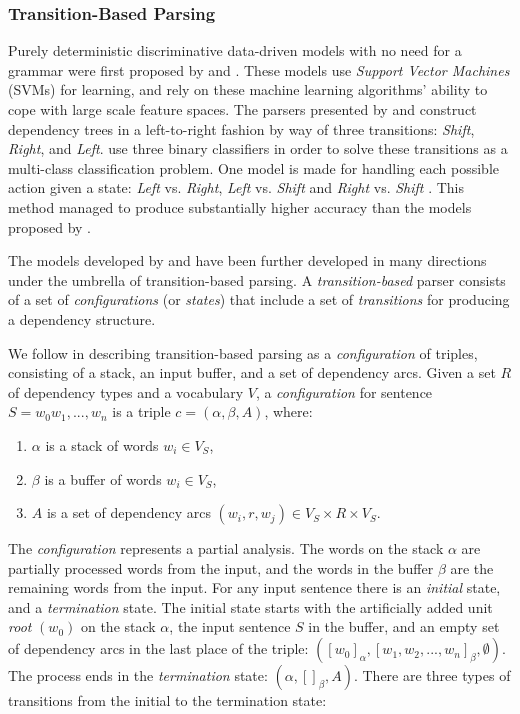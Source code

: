 \subsubsection{Transition-Based Parsing}
\label{ssc:background:transition-based}

Purely deterministic discriminative data-driven models with no need for a grammar were first proposed by  and . These models use \textit{Support Vector Machines} (SVMs) for learning, and rely on these machine learning algorithms' ability to cope with large scale feature spaces. The parsers presented by \citeauthor{Kudo:00} and \citeauthor{Yamada:03} construct dependency trees in a left-to-right fashion by way of three transitions: \textit{Shift}, \textit{Right}, and \textit{Left}. \citeauthor{Yamada:03} use three binary classifiers in order to solve these transitions as a multi-class classification problem. One model is made for handling each possible action given a state: \textit{Left} vs. \textit{Right}, \textit{Left} vs. \textit{Shift} and \textit{Right} vs. \textit{Shift} \cite{Yamada:03}. This method managed to produce substantially higher accuracy than the models proposed by .

The models developed by \citeauthor{Kudo:00} and \citeauthor{Yamada:03} have been further developed in many directions under the umbrella of transition-based parsing. A \textit{transition-based} parser consists of a set of \textit{configurations} (or \textit{states}) that include a set of \textit{transitions} for producing a dependency structure.

We follow  in describing transition-based parsing as a \textit{configuration} of triples, consisting of a stack, an input buffer, and a set of dependency arcs. Given a set $R$ of dependency types and a vocabulary $V$, a \textit{configuration} for sentence $S = w_0w_1, ..., w_n$ is a triple $c = (\alpha, \beta, A)$, where:

\begin{enumerate}
\item $\alpha$ is a stack of words $w_i \in V_S$,
\item $\beta$ is a buffer of words $w_i \in V_S$,
\item $A$ is a set of dependency arcs $(w_i, r, w_j) \in V_S \times R \times V_S$.
\end{enumerate}

The \textit{configuration} represents a partial analysis. The words on the stack $\alpha$ are partially processed words from the input, and the words in the buffer $\beta$ are the remaining words from the input. For any input sentence there is an \textit{initial} state, and a \textit{termination} state. The initial state starts with the artificially added unit \textit{root} $(w_0)$ on the stack $\alpha$, the input sentence $S$ in the buffer, and an empty set of dependency arcs in the last place of the triple: $([w_0]_\alpha, [w_1, w_2, ..., w_n]_\beta, \emptyset)$. The process ends in the \textit{termination} state: $(\alpha, []_\beta, A)$. There are three types of transitions from the initial to the termination state:

